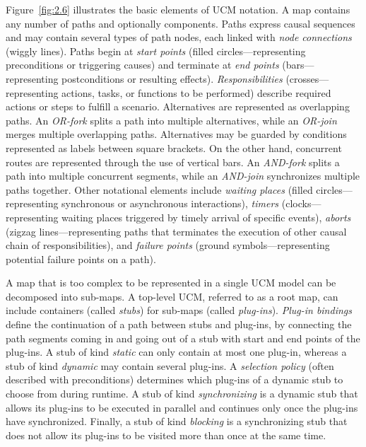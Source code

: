 Figure~\ref{fig:2.6} illustrates the basic elements of UCM notation. A map contains any number of paths and optionally components. Paths express causal sequences and may contain several types of path nodes, each linked with \emph{node connections} (wiggly lines). Paths begin at \emph{start points} (filled circles---representing preconditions or triggering causes) and terminate at \emph{end points} (bars---representing postconditions or resulting effects). \emph{Responsibilities} (crosses---representing actions, tasks, or functions to be performed) describe required actions or steps to fulfill a scenario. Alternatives are represented as overlapping paths. An \emph{OR-fork} splits a path into multiple alternatives, while an \emph{OR-join} merges multiple overlapping paths. Alternatives may be guarded by conditions represented as labels between square brackets. On the other hand, concurrent routes are represented through the use of vertical bars. An \emph{AND-fork} splits a path into multiple concurrent segments, while an \emph{AND-join} synchronizes multiple paths together. Other notational elements include \emph{waiting places} (filled circles---representing synchronous or asynchronous interactions), \emph{timers} (clocks---representing waiting places triggered by timely arrival of specific events), \emph{aborts} (zigzag lines---representing paths that terminates the execution of other causal chain of responsibilities), and \emph{failure points} (ground symbols---representing potential failure points on a path).

A map that is too complex to be represented in a single UCM model can be decomposed into sub-maps. A top-level UCM, referred to as a root map, can include containers (called \emph{stubs}) for sub-maps (called \emph{plug-ins}). \emph{Plug-in bindings} define the continuation of a path between stubs and plug-ins, by connecting the path segments coming in and going out of a stub with start and end points of the plug-ins. A stub of kind \emph{static} can only contain at most one plug-in, whereas a stub of kind \emph{dynamic} may contain several plug-ins. A \emph{selection policy} (often described with preconditions) determines which plug-ins of a dynamic stub to choose from during runtime. A stub of kind \emph{synchronizing} is a dynamic stub that allows its plug-ins to be executed in parallel and continues only once the plug-ins have synchronized. Finally, a stub of kind \emph{blocking} is a synchronizing stub that does not allow its plug-ins to be visited more than once at the same time.

